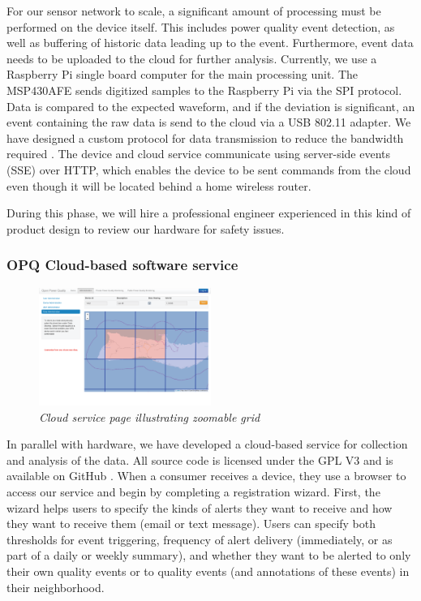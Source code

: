 For our sensor network to scale, a significant amount of processing must be performed on the device itself. This includes power quality event detection, as well as buffering of historic data leading up to the event. Furthermore, event data needs to be uploaded to the cloud for further analysis. Currently, we use a Raspberry Pi single board computer for the main processing unit. The MSP430AFE sends digitized samples to the Raspberry Pi via the SPI protocol. Data is compared to the expected waveform, and if the deviation is significant, an event containing the raw data is send to the cloud via a USB 802.11 adapter. We have designed a custom protocol for data transmission to reduce the bandwidth required \cite{opq-protocol}. The device and cloud service communicate using server-side events (SSE) over HTTP, which enables the device to be sent commands from the cloud even though it will be located behind a home wireless router.

During this phase, we will hire a professional engineer experienced in this kind of product design to review our hardware for safety issues. 

\subsubsection{OPQ Cloud-based software service}

\begin{figure}
  \includegraphics[width=0.5\textwidth]{figures/cloud-grid.eps}
  \caption{\em \small Cloud service page illustrating zoomable grid}
  \label{fig:cloud-grid}
\end{figure}  

In parallel with hardware, we have developed a cloud-based service for collection and analysis of the data. All source code is licensed under the GPL V3 and is available on GitHub \cite{opq-github}.  When a consumer receives a device, they use a browser to access our service and begin by completing a registration wizard. First, the wizard helps users to specify the kinds of alerts they want to receive and how they want to receive them (email or text message).  Users can specify both thresholds for event triggering, frequency of alert delivery (immediately, or as part of a daily or weekly summary), and whether they want to be alerted to only their own quality events or to quality events (and annotations of these events) in their neighborhood.  

